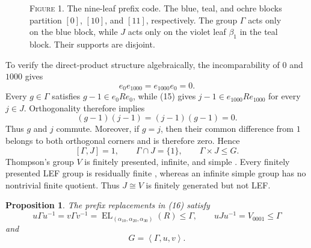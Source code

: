 \documentclass[10pt]{article}
\newtheorem{proposition}[theorem]{Proposition}
\newcommand{\EL}{\operatorname{EL}}
\newcommand{\angles}[1]{\left\langle #1\right\rangle}
\begin{document}
\begin{figure}[ht]
\medskip
\begin{minipage}{0.83\textwidth}
\small\textsc{Figure 1.} The nine-leaf prefix code. The blue, teal, and ochre blocks partition $[0]$, $[10]$, and $[11]$, respectively. The group $\Gamma$ acts only on the blue block, while $J$ acts only on the violet leaf $\beta_1$ in the teal block. Their supports are disjoint.
\end{minipage}
\end{figure}

To verify the direct-product structure algebraically, the incomparability of $0$ and $1000$ gives
\[
e_0e_{1000}=e_{1000}e_0=0.
\]
Every $g\in\Gamma$ satisfies $g-1\in e_0Re_0$, while (15) gives $j-1\in e_{1000}Re_{1000}$ for every $j\in J$. Orthogonality therefore implies
\[
(g-1)(j-1)=(j-1)(g-1)=0.
\]
Thus $g$ and $j$ commute. Moreover, if $g=j$, then their common difference from $1$ belongs to both orthogonal corners and is therefore zero. Hence
\[
[\Gamma,J]=1,\qquad \Gamma\cap J=\{1\},\qquad \Gamma\times J\leq G.
\]
Thompson's group $V$ is finitely presented, infinite, and simple \cite{CFP96}. Every finitely presented LEF group is residually finite \cite[Theorem~2.2]{VG97}, whereas an infinite simple group has no nontrivial finite quotient. Thus $J\cong V$ is finitely generated but not LEF.

\begin{proposition}
The prefix replacements in (16) satisfy
\begin{equation}
u\Gamma u^{-1}=v\Gamma v^{-1}=\EL_{(\alpha_10,\alpha_20,\alpha_30)}(R)\leq\Gamma,
\qquad uJu^{-1}=V_{0001}\leq\Gamma
\tag{17}
\end{equation}
and
\begin{equation}
G=\angles{\Gamma,u,v}.
\tag{18}
\end{equation}
\end{proposition}
\end{document}
